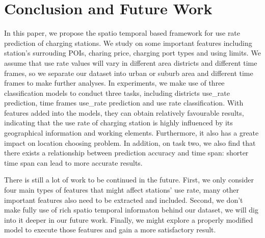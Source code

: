 \documentclass[conference]{IEEEtran}
\begin{document}
\section{Conclusion and Future Work}
In this paper, we propose the spatio temporal based framework for use rate prediction of charging stations. We study on some important features including station's surrouding POIs, charing price, charging port types and using limits. We assume that use rate values will vary in different area districts and different time frames, so we separate our dataset into urban or suburb area and different time frames to make further analyses. In experiments, we make use of three classification models to conduct three tasks, including districts use\_rate prediction, time frames use\_rate prediction and use rate classification. With features added into the models, they can obtain relatively favourable results, indicating that the use rate of charging station is highly influenced by its geographical information and working elements. Furthermore, it also has a greate impact on location choosing problem. In addition, on task two, we also find that there exists a relationship between prediction accuracy and time span: shorter time span can lead to more accurate results. 

There is still a lot of work to be continued in the future. First, we only consider four main types of features that might affect stations' use rate, many other important features also need to be extracted and included. Second, we don't make fully use of rich spatio temporal informaton behind our dataset, we will dig into it deeper in our future work. Finally, we might explore a properly modified model to execute those features and gain a more satisfactory result.




\end{document}
